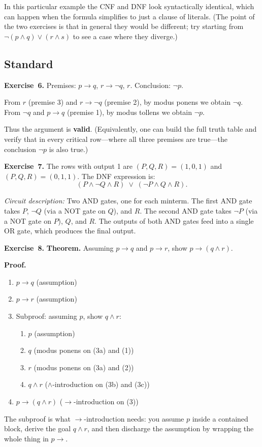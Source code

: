 \documentclass[11pt]{article}
\begin{document}
In this particular example the CNF and DNF look syntactically identical, which can happen when the formula simplifies to just a clause of literals. (The point of the two exercises is that in general they would be different; try starting from $\lnot(p \wedge q) \vee (r \wedge s)$ to see a case where they diverge.)

\subsection*{Standard}

\textbf{Exercise~6.}
Premises: $p \to q$, $r \to \lnot q$, $r$. Conclusion: $\lnot p$.

From $r$ (premise 3) and $r \to \lnot q$ (premise 2), by modus ponens we
obtain $\lnot q$. From $\lnot q$ and $p \to q$ (premise 1), by modus
tollens we obtain $\lnot p$.

Thus the argument is \textbf{valid}. (Equivalently, one can build the full
truth table and verify that in every critical row---where all three premises
are true---the conclusion $\lnot p$ is also true.)

\medskip
\textbf{Exercise~7.}
The rows with output 1 are $(P,Q,R) = (1,0,1)$ and $(P,Q,R) = (0,1,1)$.
The DNF expression is:
\[
  (P \wedge \lnot Q \wedge R) \;\vee\; (\lnot P \wedge Q \wedge R).
\]

\emph{Circuit description:} Two AND gates, one for each minterm. The first
AND gate takes $P$, $\lnot Q$ (via a NOT gate on $Q$), and $R$. The second
AND gate takes $\lnot P$ (via a NOT gate on $P$), $Q$, and $R$. The outputs
of both AND gates feed into a single OR gate, which produces the final output.

\medskip
\textbf{Exercise~8.}
\noindent\textbf{Theorem.} Assuming $p \to q$ and $p \to r$, show $p \to (q \wedge r)$.

\noindent\textbf{Proof.}
\begin{enumerate}
  \item $p \to q$ \hfill (assumption)
  \item $p \to r$ \hfill (assumption)
  \item Subproof: assuming $p$, show $q \wedge r$:
    \begin{enumerate}[label=(3\alph*)]
      \item $p$ \hfill (assumption)
      \item $q$ \hfill (modus ponens on (3a) and (1))
      \item $r$ \hfill (modus ponens on (3a) and (2))
      \item $q \wedge r$ \hfill ($\wedge$-introduction on (3b) and (3c))
    \end{enumerate}
  \item $p \to (q \wedge r)$ \hfill ($\to$-introduction on (3))
\end{enumerate}
\noindent The subproof is what $\to$-introduction needs: you assume $p$ inside a contained block, derive the goal $q \wedge r$, and then discharge the assumption by wrapping the whole thing in $p \to$.
\end{document}
